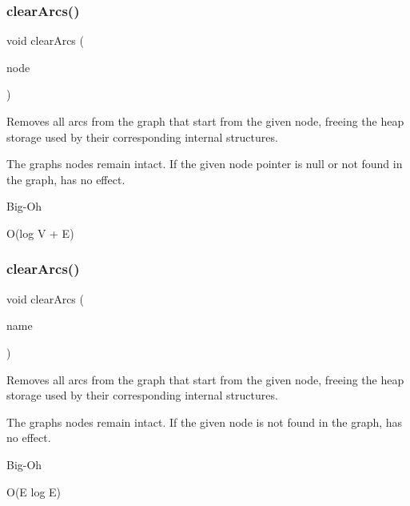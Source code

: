 \subsubsection{\texorpdfstring{clear\+Arcs()}{clearArcs()}\hspace{0.1cm}{\footnotesize\ttfamily [2/3]}}
{\footnotesize\ttfamily void clear\+Arcs (\begin{DoxyParamCaption}\item[{Node\+Type $\ast$}]{node }\end{DoxyParamCaption})}



Removes all arcs from the graph that start from the given node, freeing the heap storage used by their corresponding internal structures. 

The graph\textquotesingle{}s nodes remain intact. If the given node pointer is null or not found in the graph, has no effect. \begin{DoxyRefDesc}{Big-\/\+Oh}
\item[\mbox{\hyperlink{BigOh__BigOh000051}{Big-\/\+Oh}}]O(log V + E) \end{DoxyRefDesc}
\mbox{\label{classGraph_a2d8ecb9c6768fff244b2be46319385cc}} 
\subsubsection{\texorpdfstring{clear\+Arcs()}{clearArcs()}\hspace{0.1cm}{\footnotesize\ttfamily [3/3]}}
{\footnotesize\ttfamily void clear\+Arcs (\begin{DoxyParamCaption}\item[{const std\+::string \&}]{name }\end{DoxyParamCaption})}



Removes all arcs from the graph that start from the given node, freeing the heap storage used by their corresponding internal structures. 

The graph\textquotesingle{}s nodes remain intact. If the given node is not found in the graph, has no effect. \begin{DoxyRefDesc}{Big-\/\+Oh}
\item[\mbox{\hyperlink{BigOh__BigOh000052}{Big-\/\+Oh}}]O(\+E log E) \end{DoxyRefDesc}
\mbox{\label{classGraph_a9ca50139471975b82fdc6b1977bcfa4a}} 
